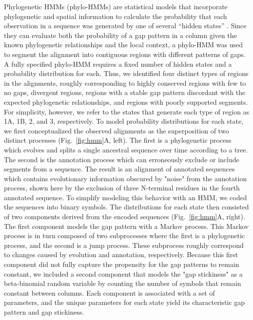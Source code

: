 \documentclass[10pt,letterpaper]{article}
\begin{document}
Phylogenetic HMMs (phylo-HMMs) are statistical models that incorporate phylogenetic and spatial information to calculate the probability that each observation in a sequence was generated by one of several “hidden states” \cite{Felsenstein1996}. Since they can evaluate both the probability of a gap pattern in a column given the known phylogenetic relationships and the local context, a phylo-HMM was used to segment the alignment into contiguous regions with different patterns of gaps. A fully specified phylo-HMM requires a fixed number of hidden states and a probability distribution for each. Thus, we identified four distinct types of regions in the alignments, roughly corresponding to highly conserved regions with few to no gaps, divergent regions, regions with a stable gap pattern discordant with the expected phylogenetic relationships, and regions with poorly supported segments. For simplicity, however, we refer to the states that generate each type of region as 1A, 1B, 2, and 3, respectively. To model probability distributions for each state, we first conceptualized the observed alignments as the superposition of two distinct processes (Fig.~\ref{fig:hmm}A, left). The first is a phylogenetic process which evolves and splits a single ancestral sequence over time according to a tree. The second is the annotation process which can erroneously exclude or include segments from a sequence. The result is an alignment of annotated sequences which contains evolutionary information obscured by "noise" from the annotation process, shown here by the exclusion of three N-terminal residues in the fourth annotated sequence. To simplify modeling this behavior with an HMM, we coded the sequences into binary symbols. The distributions for each state then consisted of two components derived from the encoded sequences (Fig.~\ref{fig:hmm}A, right). The first component models the gap pattern with a Markov process. This Markov process is in turn composed of two subprocesses where the first is a phylogenetic process, and the second is a jump process. These subprocess roughly correspond to changes caused by evolution and annotation, respectively. Because this first component did not fully capture the propensity for the gap patterns to remain constant, we included a second component that models the "gap stickiness" as a beta-binomial random variable by counting the number of symbols that remain constant between columns. Each component is associated with a set of parameters, and the unique parameters for each state yield its characteristic gap pattern and gap stickiness.
\end{document}
